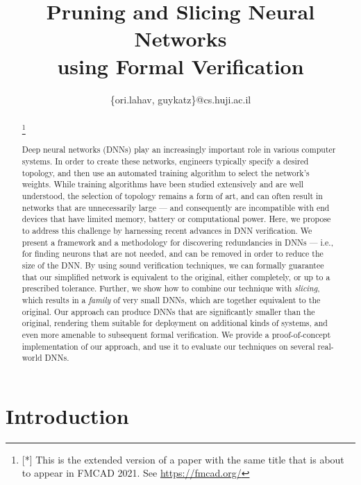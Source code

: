 \documentclass[10pt, conference, twocolumn, compsocconf]{IEEEtran}
\theoremstyle{remark}
\newcommand\blfootnote[1]{%
  \begingroup
  \renewcommand\thefootnote{}\footnote{#1}%
  \addtocounter{footnote}{-1}%
  \endgroup
}
\begin{document}
\title{Pruning and Slicing Neural Networks\\
using Formal Verification}

\author{
\{ori.lahav, guykatz\}@cs.huji.ac.il
}


\maketitle

\begin{abstract}
\blfootnote{[*] This is the extended version
of a paper with the same title that is about to appear in FMCAD 2021.
See \url{https://fmcad.org/}}
  Deep neural networks (DNNs) play an increasingly important role in
  various computer systems. In order to create these networks,
  engineers typically specify a desired topology, and then use an
  automated training algorithm to select the network's weights. While
  training algorithms have been studied extensively and are well
  understood, the selection of topology remains a form of art, and can
  often result in networks that are unnecessarily large --- and
  consequently are incompatible with end devices that have limited
  memory, battery or computational power. Here, we propose to address
  this challenge by harnessing recent advances in DNN verification.
  We present a framework and a methodology for discovering
  redundancies in DNNs --- i.e., for finding neurons that are not
  needed, and can be removed in order to reduce the size of the DNN.
  By using sound verification techniques, we can formally guarantee
  that our simplified network is equivalent to the original, either
  completely, or up to a prescribed tolerance. Further, we show how to
  combine our technique with \emph{slicing}, which results in a
  \emph{family} of very small DNNs, which are together equivalent to
  the original. Our approach can produce DNNs that are significantly
  smaller than the original, rendering them suitable for deployment on
  additional kinds of systems, and even more amenable to subsequent
  formal verification.  We provide a proof-of-concept implementation
  of our approach, and use it to evaluate our techniques on several
  real-world DNNs.

\end{abstract}

\section{Introduction}
\end{document}
